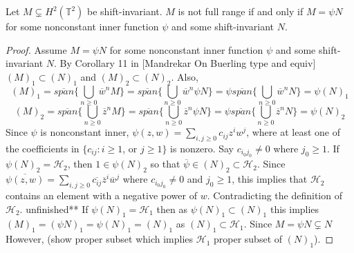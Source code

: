 \documentclass[10pt,a4paper]{amsart}
\begin{document}
\begin{theorem}
Let $M \subsetneq H^2(\mathbb{T}^2)$ be shift-invariant. $M$ is not full range if and only if $M = \psi N$ for some nonconstant inner function $\psi$ and some shift-invariant $N$.
\end{theorem}

\begin{proof}
    Assume $M = \psi N$ for some nonconstant inner function $\psi$ and some shift-invariant $N$. By Corollary 11 in [Mandrekar On Buerling type and equiv] $(M)_1 \subset (N)_1$   and $(M)_2 \subset (N)_2$. Also, 
    \begin{displaymath}
(M)_1 = \overline{span}
\{ \underset{n \geq 0}{\bigcup}{\overline{w}^n M} \} = \overline{span}
\{ \underset{n \geq 0}{\bigcup}{\overline{w}^n } \psi N \} = \psi  \overline{span}
\{ \underset{n \geq 0}{\bigcup}{\overline{w}^n N} \} = \psi (N)_1 
    \end{displaymath}
    \begin{displaymath}
(M)_2 = \overline{span}
\{ \underset{n \geq 0}{\bigcup}{\overline{z}^n M} \} = \overline{span}
\{ \underset{n \geq 0}{\bigcup}{\overline{z}^n } \psi N \} = \psi  \overline{span}
\{ \underset{n \geq 0}{\bigcup}{\overline{z}^n N} \} = \psi (N)_2 
    \end{displaymath}
Since $\psi$ is nonconstant inner, $\psi (z, w) =  \underset{i, j \geq 0}{\sum} c_{ij} z^i w^j$, where at least one of the coefficients in $\{c_{ij}: i \geq 1 $, or $j \geq 1\}$ is nonzero. Say $c_{i_0 j_0} \neq 0$ where $j_0 \geq 1$.  If $\psi (N)_2 = \mathcal{H}_2$, then $1 \in \psi (N)_2$ so that $\overline{\psi} \in (N)_2 \subset \mathcal{H}_2$. Since $\overline{\psi (z, w)} =  \underset{i, j \geq 0}{\sum} \overline{c_{ij}} \overline{z}^i \overline{w}^j$ where $c_{i_0 j_0} \neq 0$ and $j_0 \geq 1$, this implies that $\mathcal{H}_2$ contains an element with a negative power of $w$. Contradicting the definition of $\mathcal{H}_2$. 
\newline
\newline
unfinished**
If $\psi (N)_1 = \mathcal{H}_1$ then as $\psi (N)_1 \subset (N)_1$ %
this implies $ (M)_1 = (\psi N)_1 = \psi (N)_1 = (N)_1$ as $(N)_1 \subset \mathcal{H}_1$. Since $M = \psi N \subsetneq N$  However,  (show proper subset which implies $\mathcal{H}_1$ proper subset of $(N)_1$).
\end{proof}
\end{document}
